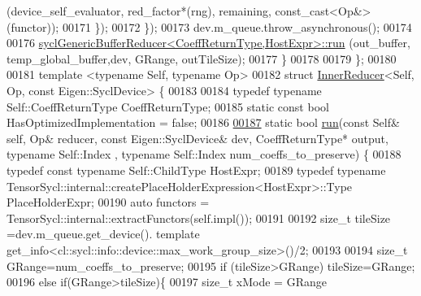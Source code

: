 \begin{DoxyCode}
      (device\_self\_evaluator, red\_factor*(rng), remaining, const\_cast<Op&>(functor));
00171       \});
00172     \});
00173   dev.m\_queue.throw\_asynchronous();
00174 
00176   \hyperlink{struct_eigen_1_1internal_1_1sycl_generic_buffer_reducer}{syclGenericBufferReducer<CoeffReturnType,HostExpr>::run}
      (out\_buffer, temp\_global\_buffer,dev, GRange,  outTileSize);
00177   \}
00178 
00179 \};
00180 
00181 \textcolor{keyword}{template} <\textcolor{keyword}{typename} Self, \textcolor{keyword}{typename} Op>
00182 \textcolor{keyword}{struct }\hyperlink{struct_eigen_1_1internal_1_1_inner_reducer}{InnerReducer}<Self, Op, const Eigen::SyclDevice> \{
00183 
00184   \textcolor{keyword}{typedef} \textcolor{keyword}{typename} Self::CoeffReturnType CoeffReturnType;
00185   \textcolor{keyword}{static} \textcolor{keyword}{const} \textcolor{keywordtype}{bool} HasOptimizedImplementation = \textcolor{keyword}{false};
00186 
\hyperlink{struct_eigen_1_1internal_1_1_inner_reducer_3_01_self_00_01_op_00_01const_01_eigen_1_1_sycl_device_01_4_a471bb175078f166e0d5c4040fc4494d9}{00187}   \textcolor{keyword}{static} \textcolor{keywordtype}{bool} \hyperlink{struct_eigen_1_1internal_1_1_inner_reducer_3_01_self_00_01_op_00_01const_01_eigen_1_1_sycl_device_01_4_a471bb175078f166e0d5c4040fc4494d9}{run}(\textcolor{keyword}{const} Self& \textcolor{keyword}{self}, Op& reducer, \textcolor{keyword}{const} Eigen::SyclDevice& dev, CoeffReturnType* output, \textcolor{keyword}{
      typename} Self::Index , \textcolor{keyword}{typename} Self::Index num\_coeffs\_to\_preserve) \{
00188     \textcolor{keyword}{typedef} \textcolor{keyword}{const} \textcolor{keyword}{typename} Self::ChildType HostExpr; 
00189     \textcolor{keyword}{typedef}  \textcolor{keyword}{typename} TensorSycl::internal::createPlaceHolderExpression<HostExpr>::Type PlaceHolderExpr;
00190     \textcolor{keyword}{auto} functors = TensorSycl::internal::extractFunctors(\textcolor{keyword}{self}.impl());
00191 
00192     \textcolor{keywordtype}{size\_t} tileSize =dev.m\_queue.get\_device(). \textcolor{keyword}{template} 
      get\_info<cl::sycl::info::device::max\_work\_group\_size>()/2;
00193 
00194     \textcolor{keywordtype}{size\_t} GRange=num\_coeffs\_to\_preserve;
00195     \textcolor{keywordflow}{if} (tileSize>GRange) tileSize=GRange;
00196     \textcolor{keywordflow}{else} \textcolor{keywordflow}{if}(GRange>tileSize)\{
00197       \textcolor{keywordtype}{size\_t} xMode = GRange %

\end{DoxyCode}
